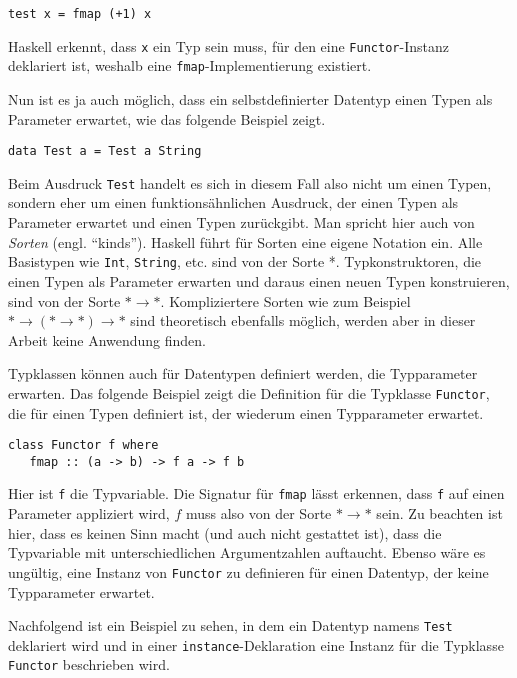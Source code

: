 \begin{verbatim}
test x = fmap (+1) x
\end{verbatim}

Haskell erkennt, dass \texttt{x} ein Typ sein muss, für den eine \texttt{Functor}-Instanz deklariert ist, weshalb eine
\texttt{fmap}-Implementierung existiert.

Nun ist es ja auch möglich, dass ein selbstdefinierter Datentyp einen Typen als Parameter erwartet, wie das folgende Beispiel
zeigt.

\begin{verbatim}
data Test a = Test a String
\end{verbatim}

Beim Ausdruck \texttt{Test} handelt es sich in diesem Fall also nicht um einen Typen, sondern eher um einen funktionsähnlichen Ausdruck, der
einen Typen als Parameter erwartet und einen Typen zurückgibt. Man spricht hier auch von \textit{Sorten} (engl. ``kinds''). Haskell
führt für Sorten eine eigene Notation ein. Alle Basistypen wie \texttt{Int}, \texttt{String}, etc. sind von der Sorte *.
Typkonstruktoren, die einen Typen als Parameter erwarten und daraus einen neuen Typen konstruieren, sind von der Sorte
$* \rightarrow *$.
Kompliziertere Sorten wie zum Beispiel $* \rightarrow (* \rightarrow *) \rightarrow *$ sind theoretisch ebenfalls möglich,
werden aber in dieser Arbeit keine Anwendung finden.

Typklassen können auch für Datentypen definiert werden, die Typparameter erwarten. Das folgende Beispiel zeigt die
Definition für die Typklasse \texttt{Functor}, die für einen Typen definiert ist, der wiederum einen Typparameter erwartet.

\begin{verbatim}
class Functor f where
   fmap :: (a -> b) -> f a -> f b
\end{verbatim}

Hier ist \texttt{f} die Typvariable. Die Signatur für \texttt{fmap} lässt erkennen, dass \texttt{f} auf einen Parameter appliziert
wird, $f$ muss also von der Sorte $* \rightarrow *$ sein. Zu beachten ist hier, dass es keinen Sinn macht (und auch nicht
gestattet ist), dass die Typvariable mit unterschiedlichen Argumentzahlen auftaucht. Ebenso wäre es ungültig,
eine Instanz von \texttt{Functor} zu definieren für einen Datentyp, der keine Typparameter erwartet.

Nachfolgend ist ein Beispiel zu sehen, in dem ein Datentyp namens \texttt{Test} deklariert wird und in einer \texttt{instance}-Deklaration
eine Instanz für die Typklasse \texttt{Functor} beschrieben wird.

